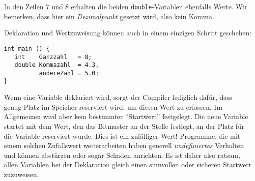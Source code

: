 In den Zeilen 7 und 8 erhalten die beiden \texttt{double}-Variablen ebenfalls Werte. Wir bemerken, dass hier ein \emph{Dezimalpunkt} gesetzt wird, also kein Komma.

Deklaration und Wertzuweisung können auch in einem einzigen Schritt geschehen:
\begin{codebox}
\begin{verbatim}
int main () {
   int    Ganzzahl   = 8;
   double Kommazahl  = 4.3,
          andereZahl = 5.0;
}
\end{verbatim}
\end{codebox}

\begin{hintbox}
Wenn eine Variable deklariert wird, sorgt der Compiler lediglich dafür, dass genug Platz im Speicher reserviert wird, um diesen Wert zu erfassen. Im Allgemeinen wird aber kein bestimmter \enquote{Startwert} festgelegt. Die neue Variable startet mit dem Wert, den das Bitmuster an der Stelle festlegt, an der Platz für die Variable reserviert wurde. Dies ist ein zufälliger Wert! Programme, die mit einem solchen Zufallswert weiterarbeiten haben generell \emph{undefiniertes} Verhalten und können abstürzen oder sogar Schaden anrichten. Es ist daher also ratsam, allen Variablen bei der Deklaration gleich einen sinnvollen oder sicheren Startwert zuzuweisen.
\end{hintbox}

